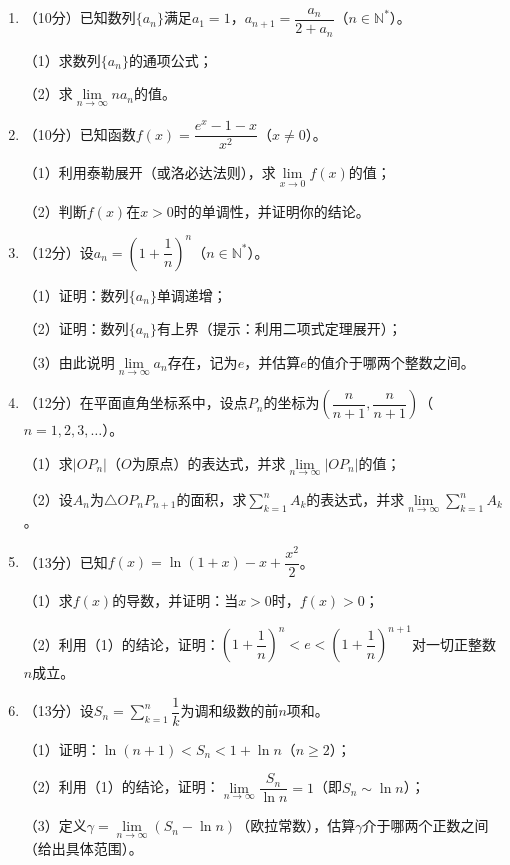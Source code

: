 \documentclass[12pt, a4paper]{ctexart}
\begin{document}
\begin{enumerate}[start=17]
\item （10分）已知数列$\{a_n\}$满足$a_1=1$，$a_{n+1}=\dfrac{a_n}{2+a_n}$（$n\in\mathbb{N}^*$）。

（1）求数列$\{a_n\}$的通项公式；

（2）求$\lim\limits_{n\to\infty}na_n$的值。

\item （10分）已知函数$f(x)=\dfrac{e^x-1-x}{x^2}$（$x\neq 0$）。

（1）利用泰勒展开（或洛必达法则），求$\lim\limits_{x\to 0}f(x)$的值；

（2）判断$f(x)$在$x>0$时的单调性，并证明你的结论。

\item （12分）设$a_n=\left(1+\dfrac{1}{n}\right)^n$（$n\in\mathbb{N}^*$）。

（1）证明：数列$\{a_n\}$单调递增；

（2）证明：数列$\{a_n\}$有上界（提示：利用二项式定理展开）；

（3）由此说明$\lim\limits_{n\to\infty}a_n$存在，记为$e$，并估算$e$的值介于哪两个整数之间。

\item （12分）在平面直角坐标系中，设点$P_n$的坐标为$\left(\dfrac{n}{n+1},\dfrac{n}{n+1}\right)$（$n=1,2,3,\ldots$）。

（1）求$|OP_n|$（$O$为原点）的表达式，并求$\lim\limits_{n\to\infty}|OP_n|$的值；

（2）设$A_n$为$\triangle OP_nP_{n+1}$的面积，求$\sum\limits_{k=1}^{n}A_k$的表达式，并求$\lim\limits_{n\to\infty}\sum\limits_{k=1}^{n}A_k$。

\item （13分）已知$f(x)=\ln(1+x)-x+\dfrac{x^2}{2}$。

（1）求$f(x)$的导数，并证明：当$x>0$时，$f(x)>0$；

（2）利用（1）的结论，证明：$\left(1+\dfrac{1}{n}\right)^n < e < \left(1+\dfrac{1}{n}\right)^{n+1}$对一切正整数$n$成立。

\item （13分）设$S_n=\sum\limits_{k=1}^{n}\dfrac{1}{k}$为调和级数的前$n$项和。

（1）证明：$\ln(n+1) < S_n < 1+\ln n$（$n\geq 2$）；

（2）利用（1）的结论，证明：$\lim\limits_{n\to\infty}\dfrac{S_n}{\ln n}=1$（即$S_n\sim\ln n$）；

（3）定义$\gamma=\lim\limits_{n\to\infty}(S_n-\ln n)$（欧拉常数），估算$\gamma$介于哪两个正数之间（给出具体范围）。
\end{enumerate}
\end{document}
